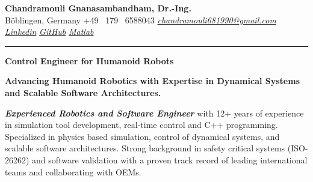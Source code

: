 \documentclass[a4paper,10pt]{article}
\newcommand{\link}[1]{{\textit{#1}}}
\begin{document}
\thispagestyle{plain}

\begin{center}
    {\Large \textbf{Chandramouli Gnanasambandham, Dr.-Ing.}}\\ 
    
    \vspace{0.2cm}
    \small B\"oblingen, Germany \hfill  \bullet  \hfill  +49 \ 179 \ 6588043 \hfill \bullet  \hfill
    \textup{\href{mailto:chandramouli681990@gmail.com}{\link{chandramouli681990@gmail.com}}} \hfill \bullet \hfill
    \textup{\href{https://linkedin.com/in/ganasambandhamc}{\link{Linkedin}}} \hfill \bullet \hfill
    \textup{\href{https://github.com/chandramouli6890}{\link{GitHub}}} \hfill \bullet \hfill
    \textup{\href{https://de.mathworks.com/matlabcentral/profile/authors/4267772}{\link{Matlab}}}

    \vspace{-0.2cm}
    {\rule{\linewidth}{0.8pt}}

    \vspace{0.2cm}
    {\Large \textbf{Control Engineer for Humanoid Robots}}
    
    \vspace{0.1cm}
    \colorbox{gray!40}{%
        \parbox{0.99\textwidth}{%
            \centering \textcolor{highlightcolor}{\textbf{Advancing Humanoid Robotics with Expertise in Dynamical Systems and Scalable Software Architectures.}}
        }%
    }
\end{center}


\noindent \textcolor{highlightcolor}{\textit{\textbf{Experienced Robotics and Software 
Engineer}}} with 12+ years of experience in simulation tool development, real-time control and C++
programming. Specialized in physics based simulation, control of dynamical systems, and scalable software
architectures. Strong background in safety critical systems (ISO-26262) and software 
validation with a proven track record of leading international teams and
collaborating with OEMs.
\end{document}
